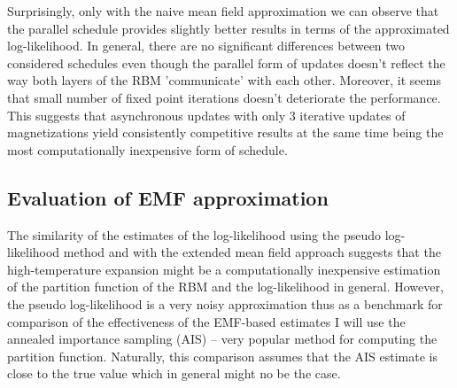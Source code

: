 Surprisingly, only with the naive mean field approximation we can observe that the parallel schedule provides slightly better results in terms of the approximated log-likelihood. In general, there are no significant differences between two considered schedules even though the parallel form of updates doesn't reflect the way both layers of the RBM 'communicate' with each other. Moreover, it seems that small number of fixed point iterations doesn't deteriorate the performance. This suggests that asynchronous updates with only $3$ iterative updates of magnetizations yield consistently competitive results at the same time being the most computationally inexpensive form of schedule.

\subsection{Evaluation of EMF approximation}
The similarity of the estimates of the log-likelihood using the pseudo log-likelihood method and with the extended mean field approach suggests that the high-temperature expansion might be a computationally inexpensive estimation of the partition function of the RBM and the log-likelihood in general. However, the pseudo log-likelihood is a very noisy approximation thus as a benchmark for comparison of the effectiveness of the EMF-based estimates I will use the annealed importance sampling (AIS) \cite{neal2001annealed} -- very popular method for computing the partition function. Naturally, this comparison assumes that the AIS estimate is close to the true value which in general might no be the case.
